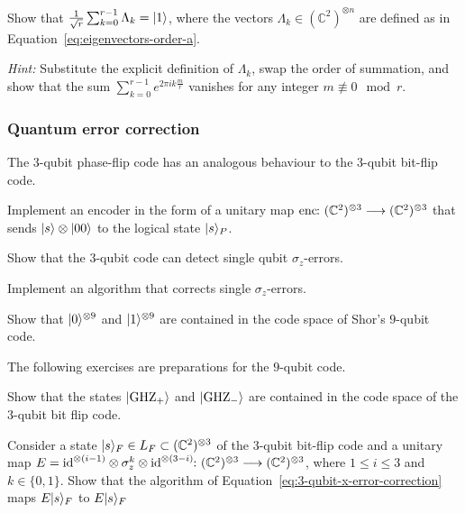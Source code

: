 \documentclass[a4paper, oneside, 12pt]{amsart}
\begin{document}
\begin{exercise}\label{exe:summation-of-vectors-gives-one}
  Show that \(\frac{1}{\sqrt{r}}\sum_{k=0}^{r-1} \Lambda_{k} = \lvert1\rangle\), where the vectors \(\Lambda_{k}\in (\mathbb{C}^{2})^{\otimes n}\) are defined as in Equation~\eqref{eq:eigenvectors-order-a}.

  \textit{Hint:}   Substitute the explicit definition of \(\Lambda_k\), swap the order of summation, and show that the sum \(\sum_{k=0}^{r-1} e^{2\pi i k \frac{m}{r}}\) vanishes for any integer \(m \nequiv 0 \mod r\).
\end{exercise}
\subsubsection*{Quantum error correction}
\begin{exercise}
  The 3-qubit phase-flip code has an analogous behaviour to the 3-qubit bit-flip code.
  \begin{thmlist}
    \item Implement an encoder in the form of a unitary map \(\mathrm{enc}\from ( \mathbb{C}^{2})^{\otimes 3} \to ( \mathbb{C}^{2})^{\otimes 3}\) that sends \(\lvert s\rangle \otimes \lvert00\rangle\) to the logical state \(\lvert s\rangle_{P}\).
    \item Show that the \(3\)-qubit code can detect single qubit \(\sigma_{z}\)-errors.
    \item Implement an algorithm that corrects single \(\sigma_{z}\)-errors.
  \end{thmlist}
\end{exercise}

\begin{exercise}
  Show that \(\lvert0\rangle^{\otimes 9}\) and \(\lvert1\rangle^{\otimes 9}\) are contained in the code space of Shor's \(9\)-qubit code.
\end{exercise}

\begin{exercise}\label{exe:error-correction-protocol-does-not-detect-and-alter-z-errors}
  The following exercises are preparations for the \(9\)-qubit code.
  \begin{thmlist}
    \item Show that the states \(\lvert\mathrm{GHZ}_{+}\rangle\) and \(\lvert\mathrm{GHZ}_{-}\rangle\) are contained in the code space of the  \(3\)-qubit bit flip code.
    \item Consider a state \(\lvert s\rangle_{F}\in L_{F} \subset ( \mathbb{C}^{2})^{\otimes 3}\) of the \(3\)-qubit bit-flip code and a unitary map \(E = \id^{\otimes (i-1)} \otimes \sigma_{z}^{k}\otimes \id^{\otimes (3-i)} \from ( \mathbb{C}^{2})^{\otimes 3} \to ( \mathbb{C}^{2})^{\otimes 3}\), where \(1\leq i \leq 3 \) and \(k \in\{ 0,1\}\).
    Show that the algorithm of Equation~\eqref{eq:3-qubit-x-error-correction} maps \(E\lvert s\rangle_{F}\) to \(E\lvert s\rangle_{F}\)
  \end{thmlist}
\end{exercise}
\end{document}
